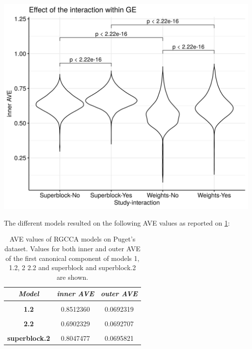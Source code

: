 \documentclass[
  12pt,
  a4paper,
  twoside,
  openright]{book}
\let\origfigure\figure
\let\endorigfigure\endfigure
\renewenvironment{figure}[1][2] {
    \expandafter\origfigure\expandafter[!ht]
} {
    \endorigfigure
}
\begin{document}
\begin{figure}
\includegraphics[width=1\linewidth]{images/pugets-weights} \caption[Effect of superblock and weights on the inner AVE on Puget's dataset.]{Effect of superblock and weights on the inner AVE on Puget's dataset. Designs with the superblock showed higher inner AVe scores than without it. Interaction yes/no indicates RNA and RNA interaction.}\label{fig:puget-weights}
\end{figure}

The different models resulted on the following AVE values as reported on \ref{tab:puget-models-ave}:

\begin{table}[H]

\caption[AVE values of RGCCA models on Puget's dataset.]{\label{tab:puget-models-ave}AVE values of RGCCA models on Puget's dataset. Values for both inner and outer AVE of the first canonical component of models 1, 1.2, 2 2.2 and superblock and superblock.2 are shown.}
\centering
\begin{tabular}[t]{|>{}c|c|>{}c|}
\hline
\em{\textbf{Model}} & \em{\textbf{inner AVE}} & \em{\textbf{outer AVE}}\\
\hline
\textbf{\cellcolor{gray!6}{1}} & \cellcolor{gray!6}{0.6333592} & \cellcolor{gray!6}{0.0692097}\\
\hline
\textbf{1.2} & 0.8512360 & 0.0692319\\
\hline
\textbf{\cellcolor{gray!6}{2}} & \cellcolor{gray!6}{0.2791546} & \cellcolor{gray!6}{0.0738695}\\
\hline
\textbf{2.2} & 0.6902329 & 0.0692707\\
\hline
\textbf{\cellcolor{gray!6}{superblock}} & \cellcolor{gray!6}{0.7055847} & \cellcolor{gray!6}{0.0734578}\\
\hline
\textbf{superblock.2} & 0.8047477 & 0.0695821\\
\hline
\end{tabular}
\end{table}
\end{document}
